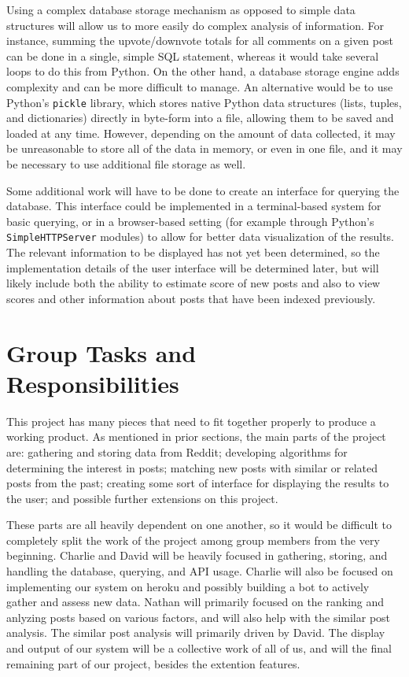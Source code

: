 \documentclass{acm_proc_article-sp}
\begin{document}
Using a complex database storage mechanism as opposed to simple data structures will allow us to more
easily do complex analysis of information.  For instance, summing the upvote/downvote totals for all
comments on a given post can be done in a single, simple SQL statement, whereas it would take several
loops to do this from Python.  On the other hand, a database storage engine adds complexity and can
be more difficult to manage.  An alternative would be to use Python's \texttt{pickle} library, which
stores native Python data structures (lists, tuples, and dictionaries) directly in byte-form into a file,
allowing them to be saved and loaded at any time.  However, depending on the amount of data collected,
it may be unreasonable to store all of the data in memory, or even in one file, and it may be necessary
to use additional file storage as well.

\balancecolumns

Some additional work will have to be done to create an interface for querying the database.  This
interface could be implemented in a terminal-based system for basic querying, or in a
browser-based setting (for example through Python's \texttt{SimpleHTTPServer} modules) to allow
for better data visualization of the results.  The relevant information to be displayed has not
yet been determined, so the implementation details of the user interface will be determined later,
but will likely include both the ability to estimate score of new posts and also to view scores
and other information about posts that have been indexed previously.


\section{Group Tasks and \\Responsibilities}

This project has many pieces that need to fit together properly to produce a working product.
As mentioned in prior sections, the main parts of the project are: gathering and storing data
from Reddit; developing algorithms for determining the interest in posts; matching new posts
with similar or related posts from the past; creating some sort of interface for
displaying the results to the user; and possible further extensions on this project.

These parts are all heavily dependent on one another, so it would be difficult to completely
split the work of the project among group members from the very beginning. Charlie and David
will be heavily focused in gathering, storing, and handling the database, querying, and API
usage. Charlie will also be focused on implementing our system on heroku and possibly
building a bot to actively gather and assess new data. Nathan will primarily focused 
on the ranking and anlyzing posts based on various factors, and will also help with the similar post
analysis. The similar post analysis will primarily driven by David. The display and output
of our system will be a collective work of all of us, and will the final remaining part of 
our project, besides the extention features.
\end{document}
